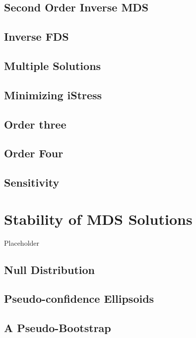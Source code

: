 \documentclass[
  12pt,
]{book}
\begin{document}
\section{Second Order Inverse MDS}\label{second-order-inverse-mds}

\section{Inverse FDS}\label{inverse-fds}

\section{Multiple Solutions}\label{multiple-solutions}

\section{Minimizing iStress}\label{minimizing-istress}

\section{Order three}\label{order-three}

\section{Order Four}\label{order-four}

\section{Sensitivity}\label{sensitivity}

\chapter{Stability of MDS Solutions}\label{stability}

Placeholder

\section{Null Distribution}\label{null-distribution}

\section{Pseudo-confidence Ellipsoids}\label{pseudo-confidence-ellipsoids}

\section{A Pseudo-Bootstrap}\label{a-pseudo-bootstrap}
\end{document}
